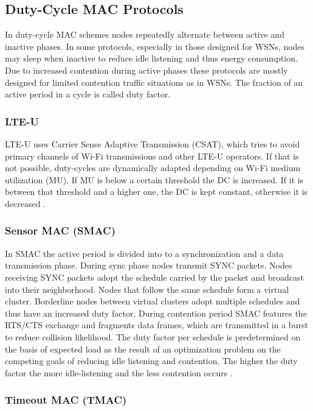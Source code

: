\subsection{Duty-Cycle MAC Protocols} \label{sec:duty-cycle-mac}  

In duty-cycle MAC schemes nodes repeatedly alternate between active and inactive phases. In some protocols, especially in those designed for WSNs, nodes may sleep when inactive to reduce idle listening and thus energy consumption. Due to increased contention during active phases these protocols are mostly designed for limited contention traffic situations as in WSNs. The fraction of an active period in a cycle is called duty factor.

\subsubsection{LTE-U}
\label{sec:lteu}
LTE-U uses Carrier Sense Adaptive Transmission (CSAT), which tries to avoid primary channels of Wi-Fi transmissions and other LTE-U operators. If that is not possible, duty-cycles are dynamically adapted depending on Wi-Fi medium utilization (MU). If MU is below a certain threshold the DC is increased. If it is between that threshold and a higher one, the DC is kept constant, otherwise it is decreased \cite{qualcomm15}.

\subsubsection{Sensor MAC (SMAC)}

In SMAC the active period is divided into to a synchronization and a data transmission phase. During sync phase nodes transmit SYNC packets. Nodes receiving SYNC packets adopt the schedule carried by the packet and broadcast into their neighborhood. Nodes that follow the same schedule form a virtual cluster. Borderline nodes between virtual clusters adopt multiple schedules and thus have an increased duty factor. During contention period SMAC features the RTS/CTS exchange and fragments data frames, which are transmitted in a burst to reduce collision likelihood. The duty factor per schedule is predetermined on the basis of expected load as the result of an optimization problem on the competing goals of reducing idle listening and contention. The higher the duty factor the more idle-listening and the less contention occurs \cite{Bachir10}\cite{Demirkol06}.

\subsubsection{Timeout MAC (TMAC)}

